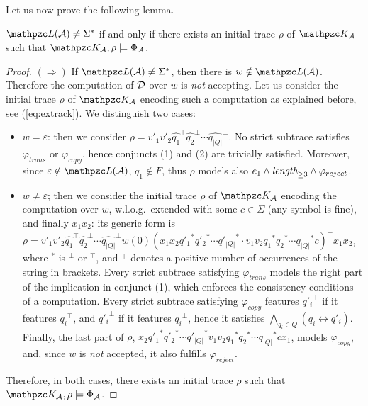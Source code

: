 Let us now prove the following lemma.
\begin{lemma}\label{lemma:nuniv}
$\Lang(\Au)\neq \Sigma^*$ if and only if there exists an initial trace $\rho$ of $\Ku_\Au$ such that $\Ku_\Au,\rho\models \Phi_\Au$.
\end{lemma}
%
\begin{proof}
$(\Rightarrow)$ If $\Lang(\Au)\neq \Sigma^*$, then there is $w\notin\Lang(\Au)$. Therefore the computation of $\mathcal{D}$ over $w$ is \emph{not} accepting. Let us consider the initial trace $\rho$ of $\Ku_\Au$ encoding such a computation as explained before, see (\ref{eq:extrack}). We distinguish two cases:
\begin{itemize}
    \item $w=\varepsilon$: then we consider $\rho=v'_1v'_2\widehat{q_1}^\top\widehat{q_2}^\bot\cdots \widehat{q_{|Q|}}^\bot $. No strict subtrace satisfies $\varphi_{trans}$ or $\varphi_{copy}$, hence conjuncts (1) and (2) are trivially satisfied. Moreover, since $\varepsilon\notin\Lang(\Au)$, $q_1\notin F$, thus $\rho$ models also $e_1\wedge \textit{length}_{\geq 3}\wedge \varphi_{reject}$.
    \item $w\neq \varepsilon$; then we consider the initial trace $\rho$ of $\Ku_\Au$ encoding the computation over $w$, w.l.o.g.\ extended with some $c\in\Sigma$ (any symbol is fine), and finally $x_1x_2$: its generic form is $\rho=v'_1v'_2\widehat{q_1}^\top\widehat{q_2}^\bot\cdots \widehat{q_{|Q|}}^\bot w(0)(x_1x_2{q'_1}^*{q'_2}^*\cdots {q'_{|Q|}}^*\cdot\allowbreak v_1v_2{q_1}^*{q_2}^*\cdots {q_{|Q|}}^*c)^+x_1x_2$, where $^*$ is $^\bot$ or $^\top$, and $^+$ denotes a positive number of occurrences of the string in brackets. Every strict subtrace satisfying $\varphi_{trans}$ models the right part of the implication in conjunct (1), which enforces the consistency conditions of a computation. 
    Every strict subtrace satisfying $\varphi_{copy}$ features ${q'_i}^\top$ if it features ${q_i}^\top$, and ${q'_i}^\bot$ if it features ${q_i}^\bot$, hence it satisfies $\bigwedge_{q_i\in Q} (q_i\leftrightarrow q'_i)$. Finally, the last part of $\rho$, $x_2{q'_1}^*{q'_2}^*\cdots {q'_{|Q|}}^*v_1v_2{q_1}^*{q_2}^*\cdots {q_{|Q|}}^*c x_1$,
    models $\varphi_{copy}$, and, since $w$ is \emph{not} accepted, it also fulfills $\varphi_{reject}$.
\end{itemize}
Therefore, in both cases, there exists an initial trace $\rho$ such that $\Ku_\Au,\rho\models \Phi_\Au$.


\end{proof}
